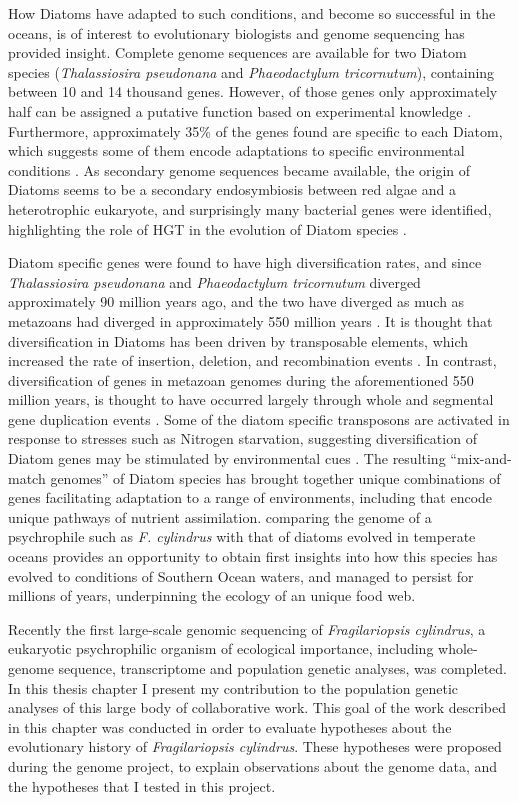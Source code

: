 How Diatoms have adapted to such conditions, and become so successful in the oceans, is of interest to evolutionary biologists and genome sequencing has provided insight.
Complete genome sequences are available for two Diatom species (\textit{Thalassiosira pseudonana} and \textit{Phaeodactylum tricornutum}), containing between 10 and 14 thousand genes.
However, of those genes only approximately half can be assigned a putative function based on experimental knowledge \parencite{Bowler2010}.
Furthermore, approximately 35\% of the genes found are specific to each Diatom, which suggests some of them encode adaptations to specific environmental conditions \parencite{Bowler2010}.
As secondary genome sequences became available, the origin of Diatoms seems to be a secondary endosymbiosis between red algae and a heterotrophic eukaryote, and surprisingly many bacterial genes were identified, highlighting the role of HGT in the evolution of Diatom species \parencite{Bowler2010,Raymond2012}.

Diatom specific genes were found to have high diversification rates, and since \textit{Thalassiosira pseudonana} and \textit{Phaeodactylum tricornutum} diverged approximately 90 million years ago, and the two have diverged as much as metazoans had diverged in approximately 550 million years \parencite{Bowler2010}.
It is thought that diversification in Diatoms has been driven by transposable elements, which increased the rate of insertion, deletion, and recombination events \parencite{Bowler2010}.
In contrast, diversification of genes in metazoan genomes during the aforementioned 550 million years, is thought to have occurred largely through whole and segmental gene duplication events \parencite{Bowler2010}.
Some of the diatom specific transposons are activated in response to stresses such as Nitrogen starvation, suggesting diversification of Diatom genes may be stimulated by environmental cues \parencite{Bowler2010}.
The resulting “mix-and-match genomes” \parencite{Armbrust2009} of Diatom species has brought together unique combinations of genes facilitating adaptation to a range of environments, including that encode unique pathways of nutrient assimilation.
comparing the genome of a psychrophile such as \textit{F. cylindrus} with that of diatoms evolved in temperate oceans provides an opportunity to obtain first insights into how this species has evolved to conditions of Southern Ocean waters, and managed to persist for millions of years, underpinning the ecology of an unique food web.

Recently the first large-scale genomic sequencing of \textit{Fragilariopsis cylindrus}, a eukaryotic psychrophilic organism of ecological importance, including whole-genome sequence, transcriptome and population genetic analyses, was completed.
In this thesis chapter I present my contribution to the population genetic analyses of this large body of collaborative work.
This goal of the work described in this chapter was conducted in order to evaluate hypotheses about the evolutionary history of \textit{Fragilariopsis cylindrus}.
These hypotheses were proposed during the genome project, to explain observations about the genome data, and the hypotheses that I tested in this project.


